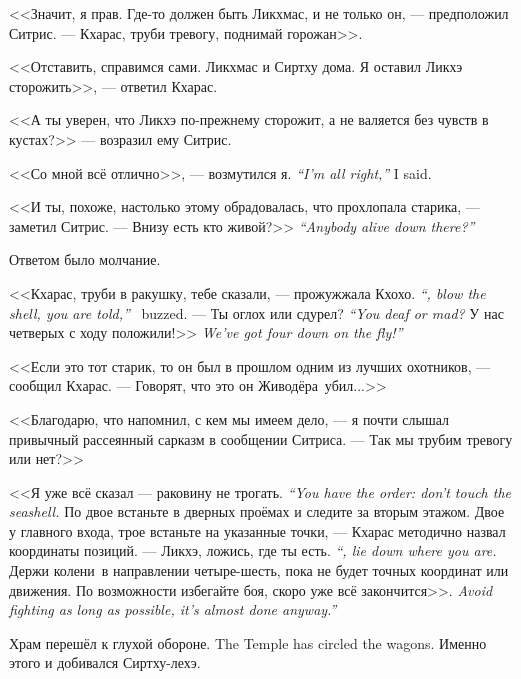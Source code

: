 <<Значит, я прав.
Где-то должен быть Ликхмас, и не только он, --- предположил Ситрис.
--- Кхарас, труби тревогу, поднимай горожан>>.

<<Отставить, справимся сами.
Ликхмас и Сиртху дома.
Я оставил Ликхэ сторожить>>, --- ответил Кхарас.

<<А ты уверен, что Ликхэ по-прежнему сторожит, а не валяется без чувств в кустах?>> --- возразил ему Ситрис.

{<<Со мной всё отлично>>, --- возмутился я.}
{\emph{``I'm all right,''} I said.}

<<И ты, похоже, настолько этому обрадовалась, что прохлопала старика, --- заметил Ситрис.
{--- Внизу есть кто живой?>>}
{\emph{``Anybody alive down there?''}}

Ответом было молчание.

{<<Кхарас, труби в ракушку, тебе сказали, --- прожужжала Кхохо.}
{\emph{``\Kcharas, blow the shell, you are told,''} \Kchoho\ buzzed.}
{--- Ты оглох или сдурел?}
{\emph{``You deaf or mad?}}
{У нас четверых с ходу положили!>>}
{\emph{We've got four down on the fly!''}}

<<Если это тот старик, то он был в прошлом одним из лучших охотников, --- сообщил Кхарас.
--- Говорят, что это он Живодёра\FM\ убил...>>

<<Благодарю, что напомнил, с кем мы имеем дело, --- я почти слышал привычный рассеянный сарказм в сообщении Ситриса.
--- Так мы трубим тревогу или нет?>>

{<<Я уже всё сказал --- раковину не трогать.}
{\emph{``You have the order: don't touch the seashell.}}
По двое встаньте в дверных проёмах и следите за вторым этажом.
Двое у главного входа, трое встаньте на указанные точки, --- Кхарас методично назвал координаты позиций.
{--- Ликхэ, ложись, где ты есть.}
{\emph{``\Likchoe, lie down where you are.}}
Держи колени\FM\ в направлении четыре-шесть, пока не будет точных координат или движения.
{По возможности избегайте боя, скоро уже всё закончится>>.}
{\emph{Avoid fighting as long as possible, it's almost done anyway.''}}

{Храм перешёл к глухой обороне.}
{The Temple has circled the wagons.}
Именно этого и добивался Сиртху-лехэ.

